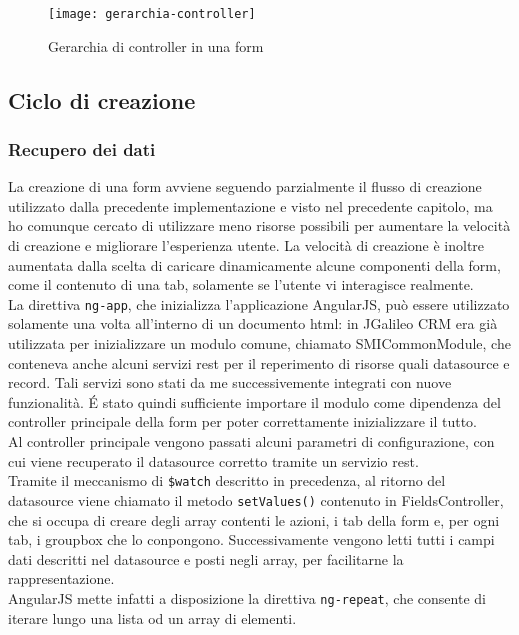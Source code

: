 \begin{figure}[h]
	\centering
	\texttt{[image: gerarchia-controller]}
	\caption{Gerarchia di controller in una form}
	\label{fig:ger-contr}
\end{figure}

\subsection{Ciclo di creazione}
\subsubsection{Recupero dei dati}
La creazione di una form avviene seguendo parzialmente il flusso di creazione utilizzato dalla precedente implementazione e visto nel precedente capitolo, ma ho comunque cercato di utilizzare meno risorse possibili per aumentare la velocità di creazione e migliorare l'esperienza utente. La velocità di creazione è inoltre aumentata dalla scelta di caricare dinamicamente alcune componenti della form, come il contenuto di una tab, solamente se l'utente vi interagisce realmente.\\
La direttiva \lstinline[language=HTML]!ng-app!, che inizializza l'applicazione AngularJS, può essere utilizzato solamente una volta all'interno di un documento \gls{html}: in JGalileo CRM era già utilizzata per inizializzare un modulo comune, chiamato SMICommonModule, che conteneva anche alcuni servizi \gls{rest} per il reperimento di risorse quali datasource e record. Tali servizi sono stati da me successivemente integrati con nuove funzionalità. \'E stato quindi sufficiente importare il modulo come dipendenza del controller principale della form per poter correttamente inizializzare il tutto.\\
Al controller principale vengono passati alcuni parametri di configurazione, con cui viene recuperato il datasource corretto tramite un servizio \gls{rest}. \\
Tramite il meccanismo di \lstinline[language=HTML]!$watch! descritto in precedenza, al ritorno del datasource
viene chiamato il metodo \lstinline[language=HTML]!setValues()! contenuto in FieldsController, che si occupa di creare degli array contenti le azioni, i tab della form e, per ogni tab, i groupbox che lo conpongono. Successivamente vengono letti tutti i campi dati descritti nel datasource e posti negli array, per facilitarne la rappresentazione.\\ AngularJS mette infatti a disposizione la direttiva \lstinline[language=HTML]!ng-repeat!, che consente di iterare lungo una lista od un array di elementi. \\
